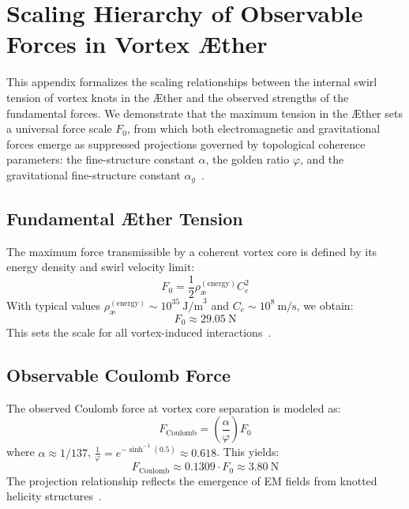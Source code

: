 \documentclass[preprint]{revtex4-2}
\begin{document}
        \section{Scaling Hierarchy of Observable Forces in Vortex \AE ther}\label{sec:force_scaling}
            This appendix formalizes the scaling relationships between the internal swirl tension of vortex knots in the \AE ther and the observed strengths of the fundamental forces. We demonstrate that the maximum tension in the \AE ther sets a universal force scale \( F_0 \), from which both electromagnetic and gravitational forces emerge as suppressed projections governed by topological coherence parameters: the fine-structure constant \( \alpha \), the golden ratio \( \varphi \), and the gravitational fine-structure constant \( \alpha_g \)~\cite{ranada1990topological, volovik2003universe}.
        
            \subsection{Fundamental Æther Tension}
            The maximum force transmissible by a coherent vortex core is defined by its energy density and swirl velocity limit:
            \begin{equation}
                F_0 = \frac{1}{2} \rho_{\text{\ae}}^{(\text{energy})} C_e^2
            \label{eq:max_core_force}
            \end{equation}
            With typical values \( \rho_{\text{\ae}}^{(\text{energy})} \sim 10^{35}~\text{J/m}^3 \) and \( C_e \sim 10^8~\text{m/s} \), we obtain:
            \begin{equation}
                F_0 \approx 29.05~\text{N}
            \end{equation}
            This sets the scale for all vortex-induced interactions~\cite{volovik2003universe}.
        
            \subsection{Observable Coulomb Force}
            The observed Coulomb force at vortex core separation is modeled as:
            \begin{equation}
                F_\text{Coulomb} = \left( \frac{\alpha}{\varphi} \right) F_0
            \end{equation}
            where \( \alpha \approx 1/137 \), \( \frac{1}{\varphi} = e^{-\sinh^{-1}(0.5)} \approx 0.618 \). This yields:
            \begin{equation}
                F_\text{Coulomb} \approx 0.1309 \cdot F_0 \approx 3.80~\text{N}
            \end{equation}
            The projection relationship reflects the emergence of EM fields from knotted helicity structures~\cite{kiehn2005topological}.
        
\end{document}
